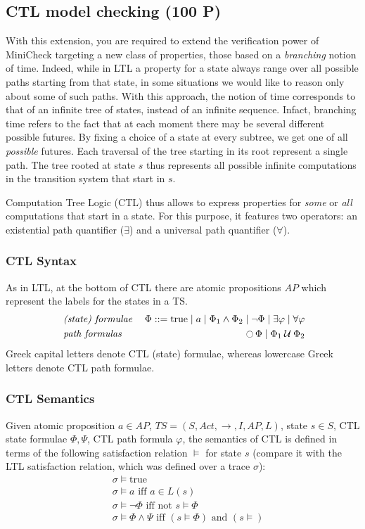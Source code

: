 \documentclass{article}
\begin{document}
\subsection{CTL model checking (100 P)}
With this extension, you are required to extend the verification power of MiniCheck targeting a new class 
of properties, those based on a \emph{branching} notion of time. Indeed, while in LTL a property for a state 
always range over all possible paths starting from that state, in some situations we would like to reason only
about some of such paths. With this approach, the notion of time corresponds to that of an infinite tree of states, 
instead of an infinite sequence. Infact, branching time refers to the fact that at each moment there may be 
several different possible futures. By fixing a choice of a state at every subtree, we get one of all \emph{possible}
futures. Each traversal of the tree starting in its root represent a single path. The tree rooted
at state $s$ thus represents all possible infinite computations in the transition system that
start in $s$.

Computation Tree Logic (CTL) thus allows to express properties for \emph{some} or \emph{all} computations 
that start in a state. For this purpose, it features two operators: an existential path quantifier ($\exists$) 
and a universal path quantifier ($\forall$). 

\subsubsection*{CTL Syntax}
As  in LTL, at the bottom of CTL there are atomic propositions $AP$ which represent the labels for the states in a TS.
\begin{align*}
    &\; \emph{(state) formulae} &\; \Phi ::= \text{true} \mid a \mid \Phi_1 \land \Phi_2 \mid \neg \Phi \mid \exists \varphi \mid \forall \varphi \\
    &\; \emph{path formulas} &\; \mathop{\ocircle}{\Phi} \mid \Phi_1 \mathbin{\mathcal{U}} \Phi_2
\end{align*}
Greek capital letters denote CTL (state) formulae, whereas lowercase Greek letters denote CTL path formulae.

\subsubsection*{CTL Semantics}
Given atomic proposition $a \in AP$, $TS = (S, Act, \rightarrow, I, AP, L)$, state $s \in S$, CTL state formulae 
$\Phi, \Psi$, CTL path formula $\varphi$, the semantics of CTL is defined in terms of the following 
satisfaction relation $\vDash$ for state $s$ (compare it with the LTL satisfaction relation, which was defined over a trace $\sigma$):
\begin{align*}
    &\; \sigma \vDash \text{true} \\
    &\; \sigma \vDash a \text{ iff } a \in L(s) \\ 
    &\; \sigma \vDash \neg \Phi \text{ iff not } s \vDash \Phi \\
    &\; \sigma \vDash \Phi \land \Psi \text{ iff } (s \vDash \Phi) \text{ and } (s \vDash)
\end{align*}
\end{document}

